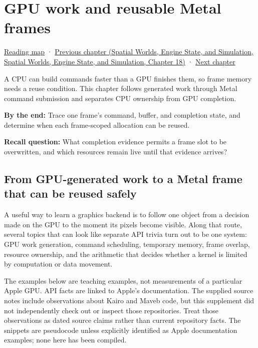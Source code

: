 \hypertarget{05-engine-i-ch019}{}
\chapter{GPU work and reusable Metal frames}\label{stagechapter:05-engine-i-ch019}\label{05-engine-i-ch019-gpu-work-and-reusable-metal-frames}

\hyperref[volume-reading-map]{Reading map} · \href{../05-Spatial-Worlds-Engine-State-and-Simulation/main.pdf\#nameddest=05-engine-i-ch018-ecs-contracts-diagnostics-and-gpu-handoff}{Previous chapter (Spatial Worlds, Engine State, and Simulation, Spatial Worlds, Engine State, and Simulation, Chapter 18)} · \hyperref[05-engine-i-ch020-gpu-performance-models-and-principled-redesign]{Next chapter}

A CPU can build commands faster than a GPU finishes them, so frame memory needs a reuse condition. This chapter follows generated work through Metal command submission and separates CPU ownership from GPU completion.

\textbf{By the end:} Trace one frame's command, buffer, and completion state, and determine when each frame-scoped allocation can be reused.

\textbf{Recall question:} What completion evidence permits a frame slot to be overwritten, and which resources remain live until that evidence arrives?

\section{From GPU-generated work to a Metal frame that can be reused safely}\label{05-engine-i-ch019-from-gpu-generated-work-to-a-metal-frame-that-can-be-reused-safely}

A useful way to learn a graphics backend is to follow one object from a decision made on the GPU to the moment its pixels become visible. Along that route, several topics that can look like separate API trivia turn out to be one system: GPU work generation, command scheduling, temporary memory, frame overlap, resource ownership, and the arithmetic that decides whether a kernel is limited by computation or data movement.

The examples below are teaching examples, not measurements of a particular Apple GPU. API facts are linked to Apple's documentation. The supplied source notes include observations about Kairo and Maveb code, but this supplement did not independently check out or inspect those repositories. Treat those observations as dated source claims rather than current repository facts. The snippets are pseudocode unless explicitly identified as Apple documentation examples; none here has been compiled.

